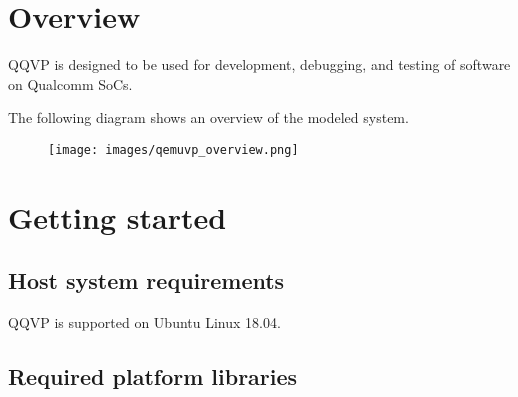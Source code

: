 %
%

\chapter{Overview}

QQVP is designed to be used for development, debugging, and testing of software on Qualcomm SoCs.

The following diagram shows an overview of the modeled system.

\begin{figure}[H]
  \texttt{[image: images/qemuvp\_overview.png]}
  \renewcommand{\thefigure}{\thechapter-\arabic{figure}}
\end{figure}



\chapter{Getting started}

\section{Host system requirements}

QQVP is supported on Ubuntu Linux 18.04.


\section{Required platform libraries}

